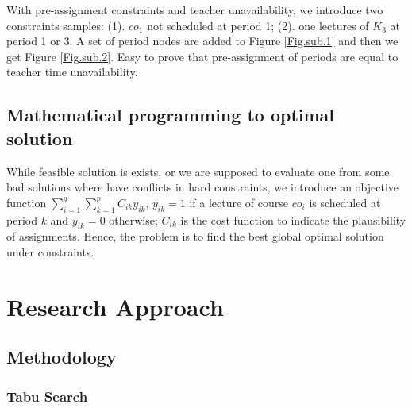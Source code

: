 \documentclass{article}
\begin{document}
With pre-assignment constraints and teacher unavailability, we introduce two constraints samples: (1). $co_{1}$ not scheduled at period 1; (2). one lectures of $K_{3}$ at period 1 or 3. A set of period nodes are added to Figure \ref{Fig.sub.1} and then we get Figure \ref{Fig.sub.2}. Easy to prove that pre-assignment of periods are equal to teacher time unavailability.

\subsection{Mathematical programming to optimal solution}

While feasible solution is exists, or we are supposed to evaluate one from some bad solutions where have conflicts in hard constraints, we introduce an objective function $\sum_{i=1}^{q} \sum_{k=1}^{p} C_{i k} y_{i k}$, $y_{i k}=1$ if a lecture of course $co_{i}$ is scheduled at period $k$ and $y_{i k}=0$ otherwise; $C_{ik}$ is the cost function to indicate the plausibility of assignments. Hence, the problem is to find the best global optimal solution under constraints.

\section{Research Approach}
\label{sec: Research Approach}

\subsection{Methodology}

\subsubsection{Tabu Search}
\end{document}
